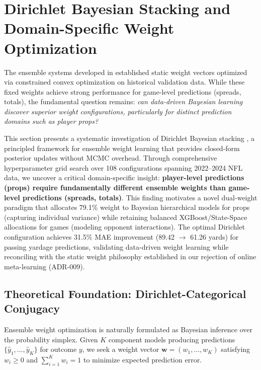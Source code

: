 \section{Dirichlet Bayesian Stacking and Domain-Specific Weight Optimization}
\label{sec:dirichlet-stacking}

The ensemble systems developed in  established static weight vectors optimized via constrained convex optimization on historical validation data. While these fixed weights achieve strong performance for game-level predictions (spreads, totals), the fundamental question remains: \emph{can data-driven Bayesian learning discover superior weight configurations, particularly for distinct prediction domains such as player props?}

This section presents a systematic investigation of Dirichlet Bayesian stacking \citep{yao2018}, a principled framework for ensemble weight learning that provides closed-form posterior updates without MCMC overhead. Through comprehensive hyperparameter grid search over 108 configurations spanning 2022--2024 NFL data, we uncover a critical domain-specific insight: \textbf{player-level predictions (props) require fundamentally different ensemble weights than game-level predictions (spreads, totals)}. This finding motivates a novel dual-weight paradigm that allocates 79.1\% weight to Bayesian hierarchical models for props (capturing individual variance) while retaining balanced XGBoost/State-Space allocations for games (modeling opponent interactions). The optimal Dirichlet configuration achieves 31.5\% MAE improvement (89.42 $\to$ 61.26 yards) for passing yardage predictions, validating data-driven weight learning while reconciling with the static weight philosophy established in our rejection of online meta-learning (ADR-009).

\subsection{Theoretical Foundation: Dirichlet-Categorical Conjugacy}
\label{subsec:dirichlet-theory}

Ensemble weight optimization is naturally formulated as Bayesian inference over the probability simplex. Given $K$ component models producing predictions $\{\hat{y}_1, \ldots, \hat{y}_K\}$ for outcome $y$, we seek a weight vector $\mathbf{w} = (w_1, \ldots, w_K)$ satisfying $w_i \geq 0$ and $\sum_{i=1}^K w_i = 1$ to minimize expected prediction error.

